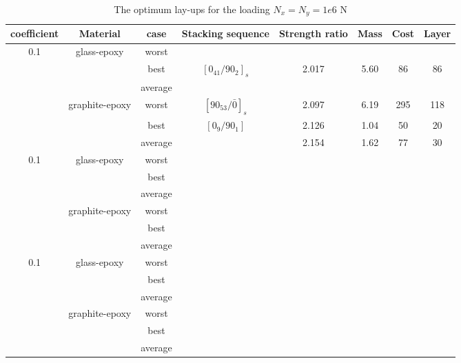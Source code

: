 \begin{table*}[!htb]
\caption{The optimum lay-ups for the loading $N_x=N_y=1e6$ N}
\centering
\begin{adjustbox}{width=1\textwidth}
	\begin{tabular}{cccccccc}
	\toprule
	coefficient		     &	 Material		               	 & case     & Stacking sequence   & Strength ratio  & Mass  &  Cost   & Layer    \\ 
	\midrule																															  
	\multirow{6}{*}{0.1} &	\multirow{3}{*}{glass-epoxy}   	 & worst     &                    &                 &        &         &       \\
						 &								     & best      & $[0_{41}/90_2]_s$  &   2.017         &  5.60  &   86    &  86   \\
					     &									 & average   &                    &                 &        &         &       \\
						 &	\multirow{3}{*}{graphite-epoxy}	 & worst     & $[90_{53}/\bar{0}]_s$ & 2.097        &  6.19  &   295   &  118   \\
						 &								     & best      & $[0_9/90_1]$       &    2.126        &  1.04  &   50    &  20    \\
					     &								     & average   &                    &    2.154        &  1.62  &   77    &  30   \\
	\multirow{6}{*}{0.1} &	\multirow{3}{*}{glass-epoxy}   	 & worst     &                    &                 &        &         &       \\
						 &								     & best      &                    &                 &        &         &       \\
					     &									 & average   &                    &                 &        &         &    \\
						 &	\multirow{3}{*}{graphite-epoxy}	 & worst     &                    &                 &        &         &    \\
					     &								     & best      &               &                 &        &         &   \\
					     &								     & average   &               &                 &        &         &   \\
	\multirow{6}{*}{0.1} &	\multirow{3}{*}{glass-epoxy}   	 & worst     &                    &                 &        &         &       \\
						 &								     & best      &                    &                 &        &         &       \\
					     &									 & average   &                    &                 &        &         &    \\
						 &	\multirow{3}{*}{graphite-epoxy}	 & worst     &                    &                 &        &         &    \\
					     &								     & best      &               &                 &        &         &   \\
					     &								     & average   &               &                 &        &         &   \\
\end{tabular}
\end{adjustbox}
\label{tab:NxNy}
\end{table*}
